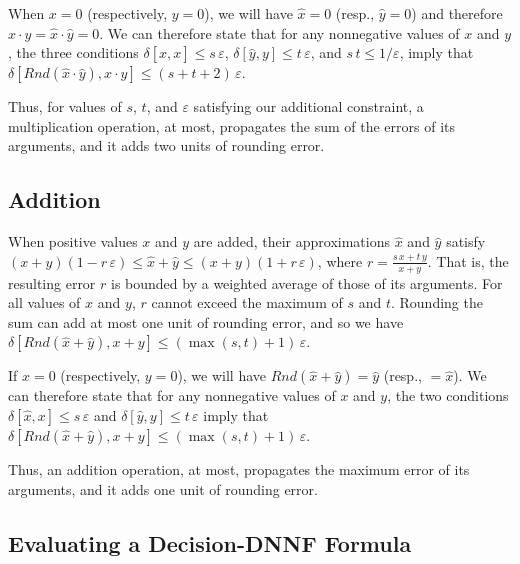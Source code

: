 \documentclass[letterpaper,USenglish,cleveref, autoref, thm-restate]{lipics-v2021}
\newcommand{\approximate}[1]{\hat{#1}}
\newcommand{\approxx}{\approximate{x}}
\newcommand{\approxy}{\approximate{y}}
\newcommand{\round}{\mathit{Rnd}}
\newcommand{\aerror}{\delta}
\newcommand{\roundepsilon}{\varepsilon}
\begin{document}
When $x=0$ (respectively, $y=0$), we will have $\approxx=0$ (resp., $\approxy = 0$) and therefore $x \cdot y = \approxx \cdot \approxy = 0$.
We can therefore state that  for any nonnegative values of $x$ and $y$, the three conditions $\aerror[\approxx, x] \leq s\,\roundepsilon$,
$\aerror[\approxy, y] \leq t\,\roundepsilon$, and
$s\,t \leq 1/\roundepsilon$, imply that
$\aerror[\round(\approxx \cdot \approxy), x \cdot y] \leq (s+t+2)\,\roundepsilon$.

Thus, for values of $s$, $t$, and $\roundepsilon$ satisfying our
additional constraint, a multiplication operation, at most, propagates
the sum of the errors of its arguments, and it adds two units of
rounding error.

\subsection{Addition}

When positive values $x$ and $y$ are added, their approximations  $\approxx$ and $\approxy$ satisfy
$(x + y) (1 - r\,\roundepsilon) \leq \approxx + \approxy \leq (x + y) (1 + r\,\roundepsilon)$, where $r = \frac{s\,x + t\,y}{x+y}$.  That is, the resulting error $r$ is bounded by a weighted average
of those of its arguments.  For all values of $x$ and $y$, $r$ cannot exceed the maximum of $s$ and $t$.
Rounding the sum can add at most one unit of rounding error, and so we have
$\aerror[\round(\approxx + \approxy), x + y] \leq (\max(s,t)+1)\,\roundepsilon$.

If $x = 0$ (respectively, $y = 0$), we will have $\round(\approxx + \approxy) = \approxy$ (resp., $= \approxx$).
We can therefore state that for any nonnegative values of $x$ and $y$, the two conditions $\aerror[\approxx, x] \leq s\,\roundepsilon$ and
$\aerror[\approxy, y] \leq t\,\roundepsilon$ imply that 
$\aerror[\round(\approxx + \approxy), x + y] \leq (\max(s,t)+1)\,\roundepsilon$.

Thus, an addition operation, at most, propagates the maximum error of its arguments, and it adds one unit of rounding error.

\subsection{Evaluating a Decision-DNNF Formula}
\label{sect:error:formula}
\end{document}
